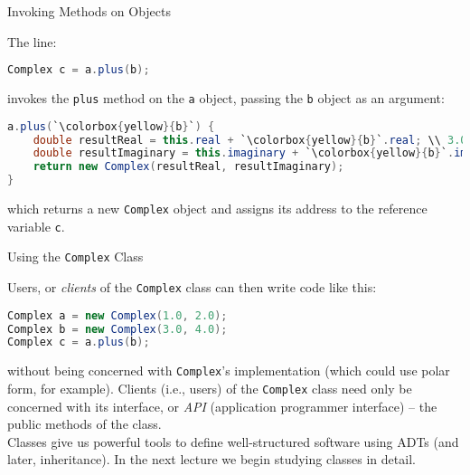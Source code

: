 \documentclass{beamer}
\begin{document}
\begin{frame}[fragile]{Invoking Methods on Objects}


The line:
\begin{lstlisting}[language=Java]
Complex c = a.plus(b);
\end{lstlisting}
invokes the {\tt plus} method on the {\tt a} object, passing the {\tt b} object as an argument:
\begin{lstlisting}[language=Java,escapechar=`]
a.plus(`\colorbox{yellow}{b}`) {
    double resultReal = this.real + `\colorbox{yellow}{b}`.real; \\ 3.0
    double resultImaginary = this.imaginary + `\colorbox{yellow}{b}`.imaginary; \\ 4.0
    return new Complex(resultReal, resultImaginary);
}
\end{lstlisting}
which returns a new {\tt Complex} object and assigns its address to the  reference variable {\tt c}.

\end{frame}

\begin{frame}[fragile]{Using the {\tt Complex} Class}


Users, or {\it clients} of the {\tt Complex} class can then write code like this:
\begin{lstlisting}[language=Java]
Complex a = new Complex(1.0, 2.0);
Complex b = new Complex(3.0, 4.0);
Complex c = a.plus(b);
\end{lstlisting}

without being concerned with {\tt Complex}'s implementation (which could use polar form, for example).  Clients (i.e., users) of the {\tt Complex} class need only be concerned with its interface, or {\it API} (application programmer interface) -- the public methods of the class.\\
\vspace{.1in}
Classes give us powerful tools to define well-structured software using ADTs (and later, inheritance). In the next lecture we begin studying classes in detail.


\end{frame}









\end{document}
